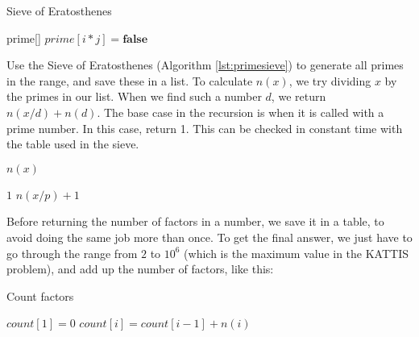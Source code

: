 \documentclass[11pt,a4paper,twoside]{article}
\begin{document}
\begin{algorithm}
    \caption{Sieve of Eratosthenes}
    \label{lst:primesieve}
    \begin{algorithmic}
        \STATE prime[] 
                \STATE $prime[i*j] = \textbf{false}$
            \ENDFOR
        \ENDFOR
    \end{algorithmic}
\end{algorithm}
            
Use the Sieve of Eratosthenes (Algorithm \ref{lst:primesieve}) to generate all
primes in the range, and save these in a list. To calculate $n(x)$, we try
dividing $x$ by the primes in our list. When we find such a number $d$, we
return $n(x/d) + n(d)$. The base case in the recursion is when it is called
with a prime number. In this case, return 1.  This can be checked in constant
time with the table used in the sieve.


\begin{algorithm}
    \caption{$n(x)$}
    \label{lst:nx}
    \begin{algorithmic}
            \RETURN $1$
        \ENDIF
                \RETURN $n(x/p) + 1$
            \ENDIF
        \ENDFOR
    \end{algorithmic}
\end{algorithm}
    

Before returning the number of factors in a number, we save it in a table, to
avoid doing the same job more than once. To get the final answer, we just have
to go through the range from $2$ to $10^6$ (which is the maximum value in the
KATTIS problem), and add up the number of factors, like this:


\begin{algorithm}
    \caption{Count factors}
    \label{factorcount}
    \begin{algorithmic}
        \STATE $count[1] = 0$
            \STATE $count[i] = count[i-1] + n(i)$
        \ENDFOR
    \end{algorithmic}
\end{algorithm}
\end{document}
